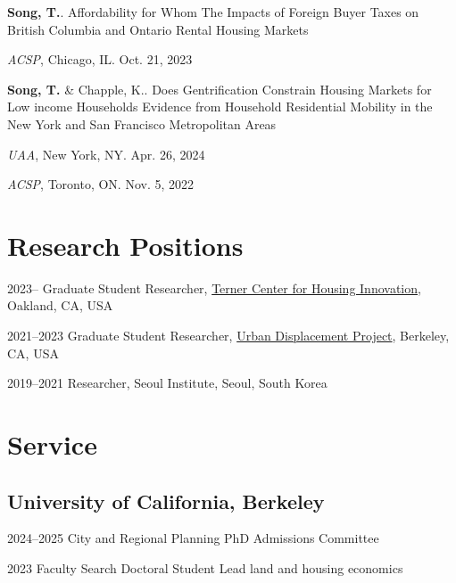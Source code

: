 \documentclass[11pt,letterpaper]{article}
\begin{document}
\begin{subpoints}
  \item \textbf{Song, T.}. Affordability for Whom The Impacts of Foreign Buyer Taxes on British Columbia and Ontario Rental Housing Markets
    \begin{subpoints2}
      \item \emph{ACSP}, Chicago, IL. Oct. 21, 2023
    \end{subpoints2}

  \item \textbf{Song, T.} \& Chapple, K.. Does Gentrification Constrain Housing Markets for Low income Households Evidence from Household Residential Mobility in the New York and San Francisco Metropolitan Areas
    \begin{subpoints2}
      \item \emph{UAA}, New York, NY. Apr. 26, 2024
      \item \emph{ACSP}, Toronto, ON. Nov. 5, 2022
    \end{subpoints2}
\end{subpoints}

\section{Research Positions}
\begin{tablist}
  \item[2023– ] \tab{}Graduate Student Researcher, \href{https://ternercenter.berkeley.edu/}{Terner Center for Housing Innovation}, Oakland, CA, USA
  \item[2021–2023] \tab{}Graduate Student Researcher, \href{https://www.urbandisplacement.org/}{Urban Displacement Project}, Berkeley, CA, USA
  \item[2019–2021] \tab{}Researcher, Seoul Institute, Seoul, South Korea
\end{tablist}

\section{Service}

\subsection{University of California, Berkeley}
\begin{tablist}
  \item[2024–2025] \tab{}City and Regional Planning PhD Admissions Committee
  \item[2023] \tab{}Faculty Search Doctoral Student Lead land and housing economics
\end{tablist}
\end{document}
